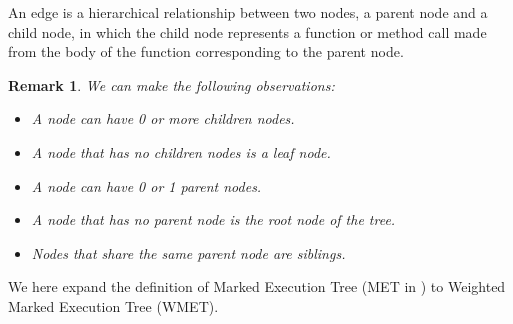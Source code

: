 \begin{definition}[Edge]
An edge is a hierarchical relationship between two nodes, a parent node and a child node, in which the child node represents a function or method call made from the body of the function corresponding to the parent node.
\end{definition}
\newtheorem{remark}{Remark}
\begin{remark}
We can make the following observations:
\begin{itemize}
    \item A node can have 0 or more children nodes.
    \item A node that has no children nodes is a leaf node.
    \item A node can have 0 or 1 parent nodes.
    \item A node that has no parent node is the root node of the tree.
    \item Nodes that share the same parent node are siblings.
\end{itemize}
\end{remark}
We here expand the definition of Marked Execution Tree (MET in \citep{optimal_strategy}) to Weighted Marked Execution Tree (WMET).
